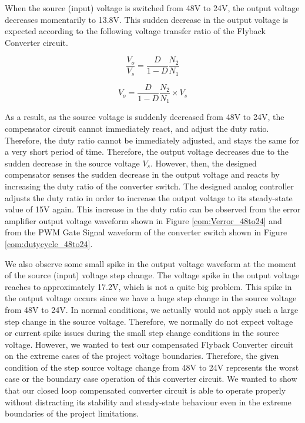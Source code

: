 When the source (input) voltage is switched from 48V to 24V, the output voltage decreases momentarily to 13.8V. This sudden decrease in the output voltage is expected according to the following voltage transfer ratio of the Flyback Converter circuit.

$$ \frac{V_o}{V_{s}} = \frac{D}{1-D}\frac{N_2}{N_1} $$

$$ V_o = \frac{D}{1-D}\frac{N_2}{N_1}\times V_s $$

As a result, as the source voltage is suddenly decreased from 48V to 24V, the compensator circuit cannot immediately react, and adjust the duty ratio. Therefore, the duty ratio cannot be immediately adjusted, and stays the same for a very short period of time. Therefore, the output voltage decreases due to the sudden decrease in the source voltage $V_s$. However, then, the designed compensator senses the sudden decrease in the output voltage and reacts by increasing the duty ratio of the converter switch. The designed analog controller adjusts the duty ratio in order to increase the output voltage to its steady-state value of 15V again. This increase in the duty ratio can be observed from the error amplifier output voltage waveform shown in Figure \ref{com:Verror_48to24} and from the PWM Gate Signal waveform of the converter switch shown in Figure \ref{com:dutycycle_48to24}.

We also observe some small spike in the output voltage waveform at the moment of the source (input) voltage step change. The voltage spike in the output voltage reaches to approximately 17.2V, which is not a quite big problem. This spike in the output voltage occurs since we have a huge step change in the source voltage from 48V to 24V. In normal conditions, we actually would not apply such a large step change in the source voltage. Therefore, we normally do not expect voltage or current spike issues during the small step change conditions in the source voltage. However, we wanted to test our compensated Flyback Converter circuit on the extreme cases of the project voltage boundaries. Therefore, the given condition of the step source voltage change from 48V to 24V represents the worst case or the boundary case operation of this converter circuit. We wanted to show that our closed loop compensated converter circuit is able to operate properly without distracting its stability and steady-state behaviour even in the extreme boundaries of the project limitations.

